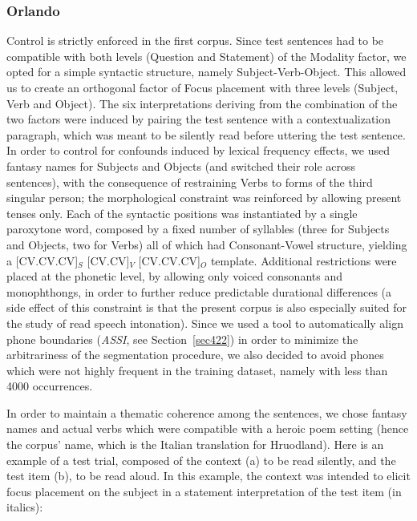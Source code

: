 \subsubsection{Orlando}\label{sec4211}
Control is strictly enforced in the first corpus. Since test sentences had to be compatible with both levels (Question and Statement) of the Modality factor, we opted for a simple syntactic structure, namely Subject-Verb-Object. This allowed us to create an orthogonal factor of Focus placement with three levels (Subject, Verb and Object). The six interpretations deriving from the combination of the two factors were induced by pairing the test sentence with a contextualization paragraph, which was meant to be silently read before uttering the test sentence. In order to control for confounds induced by lexical frequency effects, we used fantasy names for Subjects and Objects (and switched their role across sentences), with the consequence of restraining Verbs to forms of the third singular person; the morphological constraint was reinforced by allowing present tenses only. Each of the syntactic positions was instantiated by a single paroxytone word, composed by a fixed number of syllables (three for Subjects and Objects, two for Verbs) all of which had Consonant-Vowel structure, yielding a [CV.\textipa{\textvbaraccent{}}CV.CV]$_{S}$ [\textipa{\textvbaraccent{}}CV.CV]$_{V}$ [CV.\textipa{\textvbaraccent{}}CV.CV]$_{O}$ template. Additional restrictions were placed at the phonetic level, by allowing only voiced consonants and monophthongs, in order to further reduce predictable durational differences (a side effect of this constraint is that the present corpus is also especially suited for the study of read speech intonation). Since we used a tool to automatically align phone boundaries (\textit{ASSI}, see Section~\ref{sec422}) in order to minimize the arbitrariness of the segmentation procedure, we also decided to avoid phones which were not highly frequent in the training dataset, namely with less than 4000 occurrences. 

In order to maintain a thematic coherence among the sentences, we chose fantasy names and actual verbs which were compatible with a heroic poem setting (hence the corpus' name, which is the Italian translation for Hruodland). Here is an example of a test trial, composed of the context (a) to be read silently, and the test item (b), to be read aloud. In this example, the context was intended to elicit focus placement on the subject in a statement interpretation of the test item (in italics):

